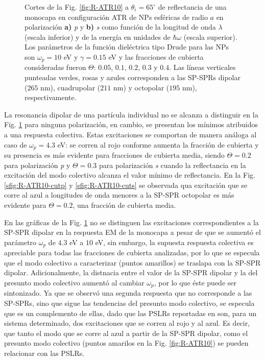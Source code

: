 \begin{figure}[h!]
	\caption{Cortes de la Fig. \ref{fig:R-ATR10} a $\theta_i = 65^\circ$ de reflectancia de una monocapa en configuración ATR de NPs esféricas de radio $a$ en polarización \textbf{a)} \emph{p} y \textbf{b)} \emph{s} como función de la longitud de onda $\lambda$ (escala inferior) y de la energía en unidades de $\hbar \omega$ (escala superior). Los parámetros de la función dieléctrica tipo Drude para las NPs son $\omega_p = 10$ eV y $\gamma = 0.15$ eV y las fracciones de cubierta consideradas fueron $\Theta$: $0. 05$, $0. 1$, $0. 2$, $0. 3$ y $0. 4$. Las líneas verticales punteadas verdes, rosas y azules corresponden a las SP-SPRs dipolar ($265$ nm), cuadrupolar ($211$ nm) y octopolar ($195$ nm), respectivamente.  }\label{fig:R-ATR10-Cuts}
	\end{figure}	

La resonancia dipolar de una partícula individual no se alcanza a distinguir en la Fig. \ref{fig:R-ATR10-Cuts} para ninguna polarización, en cambio, se presentan los mínimos atribuidos a una respuesta colectiva. Estas excitaciones se comportan de manera análoga al caso de $\omega_p = 4.3$ eV: se corren al rojo conforme aumenta la fracción de cubierta y su presencia es más evidente para fracciones de cubierta media, siendo  $\Theta=0.2$ para polarización \emph{p} y $\Theta=0.3$ para polarización \emph{s} cuando la reflectancia en la excitación del modo colectivo alcanza el valor mínimo de reflectancia. En la Fig. \ref{sfig:R-ATR10-cutp} y \ref{sfig:R-ATR10-cuts}  se observada qua excitación que se corre al azul a longitudes de onda menores a la SP-SPR octopolar es más evidente para $\Theta=0.2$, una fracción de cubierta media.

En las gráficas de la Fig. \ref{fig:R-ATR10-Cuts} no se distinguen las excitaciones correspondientes a la SP-SPR dipolar en la respuesta EM de la monocapa a pesar de que se aumentó el parámetro $\omega_p$ de $4.3$ eV a $10$ eV, sin embargo, la supuesta respuesta colectiva es apreciable para todas las fracciones de cubierta analizadas, por lo que se especula que el modo colectivo a caracterizar (puntos amarillos) se traslapa con la SP-SPR  dipolar. Adicionalmente, la distnacia entre el valor de la SP-SPR dipolar y la del presunto modo colectivo aumentó al cambiar $\omega_p$, por lo que éste puede ser sintonizado. Ya que se observó una segunda respuesta que no corresponde a las SP-SPRs, sino que sigue las tendencias del presunto modo colectivo, se especula que es un complemento  de ellas, dado que las  PSLRs reportadas en \cite{danilov2018ultra} son, para un sistema determinado, dos excitaciones que se corren al rojo y al azul. Es decir, que tanto el modo que se corre al azul a partir de la SP-SPR dipolar, como el presunto modo colectivo (puntos amarilos en la Fig. \ref{fig:R-ATR10}) se pueden relacionar con las PSLRs.  

